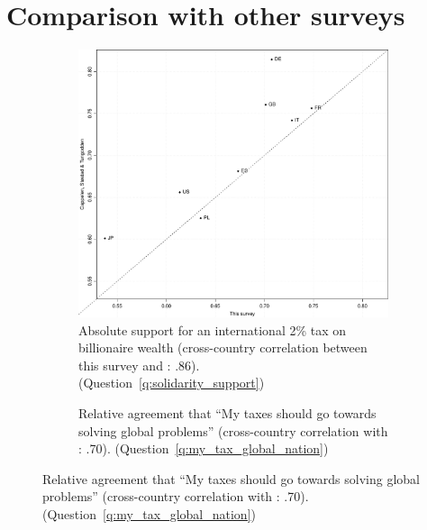 \section{Comparison with other surveys}\label{app:comparison}
\begin{figure}[h!]
\caption[Comparison with other surveys]{Comparison with similar questions in other surveys.} \label{fig:comparison}
\begin{subfigure}{.45\textwidth}
  \caption[]{Absolute support for an international 2\% tax on billionaire wealth (cross-country correlation between this survey and \cite{cappelen_majority_2025}: .86). \hfill (Question~\ref{q:solidarity_support})}
  \includegraphics[width=\textwidth]{../figures/all/billionaire_stostad.pdf}
\end{subfigure} \quad
\begin{subfigure}{.45\textwidth}
  \caption[]{Relative agreement that ``My taxes should go towards solving global problems'' (cross-country correlation with \cite{global_nation_global_2023}: .70). \hfill (Question~\ref{q:my_tax_global_nation})}%

\end{subfigure}
\end{figure}

